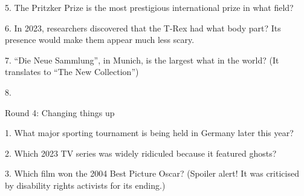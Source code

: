 \begin{frame}
\begin{center}
\Large
5. The Pritzker Prize is the most prestigious international prize in what field?
\\
\end{center}
\end{frame}
\begin{frame}
\begin{center}
\Large
6. In 2023, researchers discovered that the T-Rex had what body part? Its presence would make them appear much less scary.
\\
\end{center}
\end{frame}
\begin{frame}
\begin{center}
\Large
7. ``Die Neue Sammlung'', in Munich, is the largest what in the world? (It translates to ``The New Collection'')
\\
\end{center}
\end{frame}
\begin{frame}
\begin{center}
\Large
8. 
\end{center}
\end{frame}
\begin{frame}
\begin{center}
\Huge
Round 4: Changing things up
\end{center}
\end{frame}
\begin{frame}
\begin{center}
\Large
1. What major sporting tournament is being held in Germany later this year?
\end{center}
\end{frame}
\begin{frame}
\begin{center}
\Large
2. Which 2023 TV series was widely ridiculed because it featured ghosts?
\end{center}
\end{frame}
\begin{frame}
\begin{center}
\Large
3. Which film won the 2004 Best Picture Oscar? (Spoiler alert! It was criticised by disability rights activists for its ending.)
\end{center}
\end{frame}
